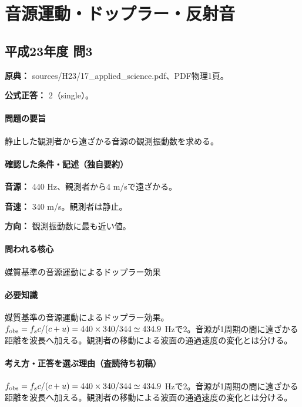 \section{音源運動・ドップラー・反射音}

\subsection{平成23年度 問3}
\label{q:h23-reg-applied-03}

\noindent\textbf{原典：} sources/H23/17\_applied\_science.pdf、PDF物理1頁。

\textbf{公式正答：} 2（single）。

\paragraph{問題の要旨} 静止した観測者から遠ざかる音源の観測振動数を求める。

\paragraph{確認した条件・記述（独自要約）}\mbox{}\par

\noindent\textbf{音源：} 440 Hz、観測者から4 m/sで遠ざかる。\par

\noindent\textbf{音速：} 340 m/s。観測者は静止。\par

\noindent\textbf{方向：} 観測振動数に最も近い値。\par

\paragraph{問われる核心} 媒質基準の音源運動によるドップラー効果

\paragraph{必要知識} 媒質基準の音源運動によるドップラー効果。\(f_{\rm obs}=f_s c/(c+u)=440\times340/344\simeq434.9\) Hzで2。音源が1周期の間に遠ざかる距離を波長へ加える。観測者の移動による波面の通過速度の変化とは分ける。

\paragraph{考え方・正答を選ぶ理由（査読待ち初稿）} \(f_{\rm obs}=f_s c/(c+u)=440\times340/344\simeq434.9\) Hzで2。音源が1周期の間に遠ざかる距離を波長へ加える。観測者の移動による波面の通過速度の変化とは分ける。

